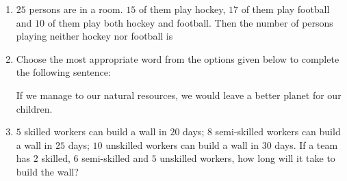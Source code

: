 \documentclass[journal,12pt,onecolumn]{IEEEtran}
\theoremstyle{remark}
\begin{document}
\begin{enumerate}
\item $25$ persons are in a room. $15$ of them play hockey, $17$ of them play football and $10$ of them play both hockey and football. 
Then the number of persons playing neither hockey nor football is  

\hfill{}

\begin{enumerate}
\end{enumerate}

\item Choose the most appropriate word from the options given below to complete the following sentence:  

If we manage to \underline{\hspace{2cm}} our natural resources, we would leave a better planet for our children.  

\hfill{}

\begin{enumerate}
\end{enumerate}

\item $5$ skilled workers can build a wall in $20$ days; $8$ semi-skilled workers can build a wall in $25$ days; $10$ unskilled workers can build a wall in $30$ days. If a team has $2$ skilled, $6$ semi-skilled and $5$ unskilled workers, how long will it take to build the wall?  

\hfill{}

\begin{enumerate}
\end{enumerate}


\end{enumerate}
\end{document}
